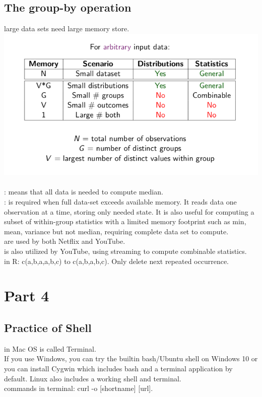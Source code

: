 \documentclass[12pt]{extarticle}
\newcommand{\<}{\langle}
\renewcommand{\>}{\rangle}
\theoremstyle{definition}
\begin{document}
\subsection{The group-by operation}
 large data sets need large memory store. 
\begingroup\centering
\includegraphics{dda}\\
\endgroup\\
\noindent
{}: means that all data is needed to compute median. \\
: is required when full data-set exceeds available memory. It reads data one observation at a time, storing only needed state. It is also useful for computing a subset of within-group statistics with a limited memory footprint such as min, mean, variance but not median, requiring complete data set to compute.\\
 are used by both Netflix and YouTube.\\
 is also utilized by YouTube, using streaming to compute combinable statistics. \\ 
 in R: c(a,b,a,a,b,c) to c(a,b,a,b,c). Only delete next repeated occurrence. \\
\section{Part 4}
\subsection{Practice of Shell}
 in Mac OS is called Terminal. \\
If you use Windows, you can try the builtin bash/Ubuntu shell on Windows 10 or you can install Cygwin which includes bash and a terminal application by default. Linux also includes a working shell and terminal.\\
 commands in terminal: curl -o [shortname] [url].
\end{document}

